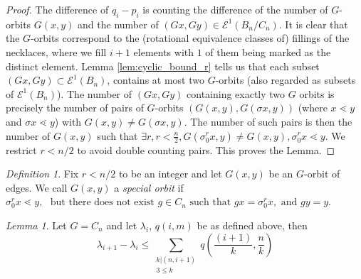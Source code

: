 \documentclass[10 pt]{amsart}
\theoremstyle{plain}
\theoremstyle{definition}
\theoremstyle{remark}
\numberwithin{equation}{section}
\newtheorem{lem}[thm]{Lemma}
\theoremstyle{remark}
\newtheorem{defn}[thm]{Definition}
\begin{document}
\begin{proof}

 The difference of $q_i - p_i$ is counting the difference of the number of $G$-orbits $G (x ,y)$ and the number of $(Gx,Gy) \in \mathcal E^1(B_n/C_n)$. It is clear that the $G$-orbits correspond to the (rotational equivalence classes of) fillings of the necklaces, where we fill $i+1$ elements with $1$ of them being marked as the distinct element. Lemma \ref{lem:cyclic_bound_r} tells us that each subset $(Gx, Gy) \subset \mathcal E^1 (B_n)$, contains at most two $G$-orbits (also regarded as subsets of $\mathcal E^1 (B_n)$). The number of $(Gx, Gy)$ containing exactly two $G$ orbits is precisely the number of pairs of $G$-orbits $(G (x, y),G(\sigma x, y ))$ (where $ x \lessdot y$ and $\sigma x \lessdot y$) with $G(x, y) \neq G(\sigma x, y).$ The number of such pairs is then the number of $G(x, y)$ such that $ \exists r,r<\frac n 2, G(\sigma_0^r x, y)\neq G(x, y),\sigma_0^r x \lessdot y.$ We restrict $r < n/2$ to avoid double counting pairs. This proves the Lemma.
\end{proof}


\begin{defn}
Fix $r < n/2$ to be an integer and let $ G(x, y)$ be an $G$-orbit of edges. We call $G(x , y)$ a {\it special orbit} if  $ \sigma_0^r x \lessdot y, \, \, \text{ but  there does not exist } g \in C_n \text{ such that } g x = \sigma_0 ^r x,  \text{ and }g y = y$. 
\end{defn}


\begin{lem}{\label{lem:cyclic_bounding_lambda}} 
Let $G =C_n$ and let $\lambda_i$, $q(i,m)$ be as defined above,  then $$\lambda_{i+1} - \lambda_i \le \sum_{\substack{k | (n , i+1) \\ 3 \le k }} q \left(\frac{(i+1)}{k},\frac{n}{k}\right) $$ 
\end{lem}
\end{document}
